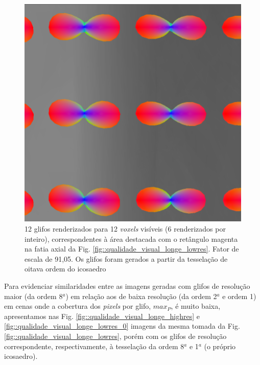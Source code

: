   \begin{figure}[H]
     \centering
     \includegraphics[width=0.5\linewidth, angle=0]{figs/Renderizacao_glifos_evolucao/Adaptividade-multimodal/fatia_perto.png}
      \caption{12 glifos renderizados para 12 \textit{voxels} visíveis (6 renderizados por inteiro), correspondentes à área destacada com o retângulo magenta na fatia axial da Fig. \ref{fig::qualidade_visual_longe_lowres}. Fator de escala de 91,05. Os glifos foram gerados a partir da tesselação de oitava ordem do icosaedro}
       \label{fig::multimodal_glifo_odf_zoom}
 \end{figure}
 
 
 
Para evidenciar similaridades entre as imagens geradas com glifos de resolução maior (da ordem 8$^a$) em relação aos de baixa resolução (da ordem 2$^a$ e ordem 1) em cenas onde a cobertura dos \textit{pixels} por glifo, $max_P$, é muito baixa, apresentamos nas Fig. \ref{fig::qualidade_visual_longe_highres} e \ref{fig::qualidade_visual_longe_lowres_0} imagens da mesma tomada da Fig. \ref{fig::qualidade_visual_longe_lowres}, porém com os glifos de resolução correspondente, respectivamente, à tesselação da ordem 8$^a$ e 1$^a$ (o próprio icosaedro).

